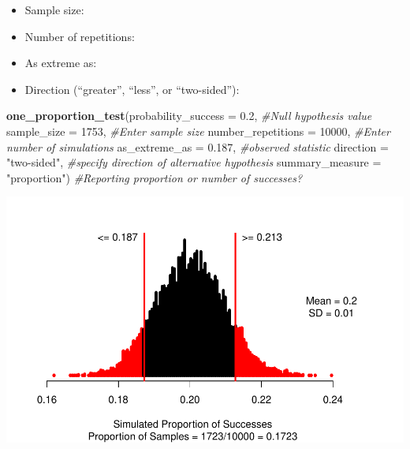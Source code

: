 \documentclass[
]{report}
\newenvironment{Shaded}{\begin{snugshade}}{\end{snugshade}}
\newcommand{\AttributeTok}[1]{\textcolor[rgb]{0.13,0.29,0.53}{#1}}
\newcommand{\CommentTok}[1]{\textcolor[rgb]{0.56,0.35,0.01}{\textit{#1}}}
\newcommand{\DecValTok}[1]{\textcolor[rgb]{0.00,0.00,0.81}{#1}}
\newcommand{\FloatTok}[1]{\textcolor[rgb]{0.00,0.00,0.81}{#1}}
\newcommand{\FunctionTok}[1]{\textcolor[rgb]{0.13,0.29,0.53}{\textbf{#1}}}
\newcommand{\NormalTok}[1]{#1}
\newcommand{\StringTok}[1]{\textcolor[rgb]{0.31,0.60,0.02}{#1}}
\providecommand{\tightlist}{%
  \setlength{\itemsep}{0pt}\setlength{\parskip}{0pt}}
\begin{document}
\vspace{0.2in}

\begin{itemize}
\tightlist
\item
  Sample size:
\end{itemize}

\vspace{0.2in}

\begin{itemize}
\tightlist
\item
  Number of repetitions:
\end{itemize}

\vspace{0.2in}

\begin{itemize}
\tightlist
\item
  As extreme as:
\end{itemize}

\vspace{0.2in}

\begin{itemize}
\tightlist
\item
  Direction (``greater'', ``less'', or ``two-sided''):
\end{itemize}

\vspace{0.2in}

\begin{Shaded}
\begin{Highlighting}[]
\FunctionTok{one\_proportion\_test}\NormalTok{(}\AttributeTok{probability\_success =} \FloatTok{0.2}\NormalTok{, }\CommentTok{\#Null hypothesis value}
                    \AttributeTok{sample\_size =} \DecValTok{1753}\NormalTok{, }\CommentTok{\#Enter sample size}
                    \AttributeTok{number\_repetitions =} \DecValTok{10000}\NormalTok{, }\CommentTok{\#Enter number of simulations}
                    \AttributeTok{as\_extreme\_as =} \FloatTok{0.187}\NormalTok{, }\CommentTok{\#observed statistic}
                    \AttributeTok{direction =} \StringTok{"two{-}sided"}\NormalTok{, }\CommentTok{\#specify direction of alternative hypothesis}
                    \AttributeTok{summary\_measure =} \StringTok{"proportion"}\NormalTok{) }\CommentTok{\#Reporting proportion or number of successes?}
\end{Highlighting}
\end{Shaded}

\begin{center}\includegraphics[width=0.7\linewidth]{05-UR-module3_review_files/figure-latex/unnamed-chunk-2-1} \end{center}
\end{document}

